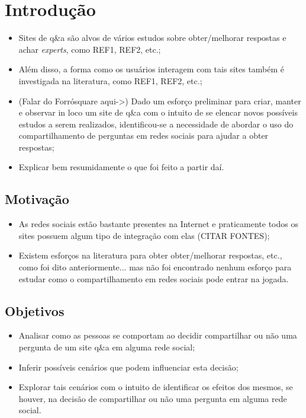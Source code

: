 \chapter{Introdução}
\begin{itemize}
    \item Sites de q\&a são alvos de vários estudos sobre obter/melhorar respostas e achar \textit{experts}, como REF1, REF2, etc.;
    \item Além disso, a forma como os usuários interagem com tais sites também é investigada na literatura, como REF1, REF2, etc.;
    \item (Falar do Forrósquare aqui->) Dado um esforço preliminar para criar, manter e observar in loco um site de q\&a com o intuito de se elencar novos possíveis estudos a serem realizados, identificou-se a necessidade de abordar o uso do compartilhamento de perguntas em redes sociais para ajudar a obter respostas;
    \item Explicar bem resumidamente o que foi feito a partir daí.
\end{itemize}

\section{Motivação}
\begin{itemize}
\item As redes sociais estão bastante presentes na Internet e praticamente todos os sites possuem algum tipo de integração com elas (CITAR FONTES);
\item Existem esforços na literatura para obter obter/melhorar respostas, etc., como foi dito anteriormente... mas não foi encontrado nenhum esforço para estudar como o compartilhamento em redes sociais pode entrar na jogada.
\end{itemize}
\section{Objetivos}
\begin{itemize}
\item Analisar como as pessoas se comportam ao decidir compartilhar ou não uma pergunta de um site q\&a em alguma rede social;
\item Inferir possíveis cenários que podem influenciar esta decisão;
\item Explorar tais cenários com o intuito de identificar os efeitos dos mesmos, se houver, na decisão de compartilhar ou não uma pergunta em alguma rede social.
\end{itemize}
